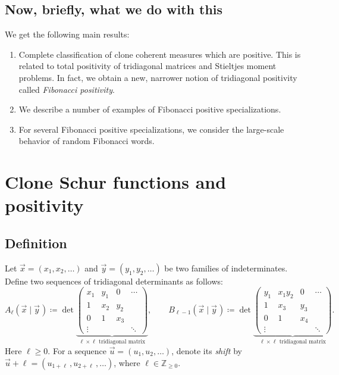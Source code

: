 \documentclass[letterpaper,11pt,oneside,reqno]{article}
\numberwithin{equation}{section}
\newcommand{\ssp}{\hspace{1pt}}
\theoremstyle{definition}
\begin{document}
\subsection{Now, briefly, what we do with this}

We get the following main results:
\begin{enumerate}
	\item Complete classification of
		clone coherent measures which are positive.
		This is related to total positivity of tridiagonal matrices and Stieltjes moment
		problems.
		In fact, we obtain a new, narrower notion of tridiagonal
		positivity called \emph{Fibonacci positivity}.
	\item We describe a number of examples of Fibonacci positive specializations.
	\item For several Fibonacci positive specializations, we consider the large-scale behavior of random Fibonacci words.
\end{enumerate}

\section{Clone Schur functions and positivity}

\subsection{Definition}

Let $\vec x=(x_1,x_2,\ldots )$ and $\vec y=(y_1,y_2,\ldots)$ be two families of indeterminates.
Define two sequences of tridiagonal determinants as follows:
\begin{equation}
	\label{eq:A_B_dets}
	A_\ell (\vec{x} \mid \vec{y}\ssp) \coloneqq
	\det
	\underbrace{\begin{pmatrix}
	x_1 & y_1 & 0 & \cdots\\
	1 & x_2 & y_2 &\\
	0 & 1 & x_3  & \\
	\vdots & & & \ddots
	\end{pmatrix}}_{\text{$\ell \times \ell $ tridiagonal matrix}} ,
	\qquad
	B_{\ell -1} (\vec{x} \mid \vec{y}\ssp) \coloneqq
	\det
	\underbrace{\begin{pmatrix}
	y_1 & x_1y_2 & 0 & \cdots\\
	1 & x_3 & y_3 &\\
	0 & 1 & x_4 & \\
	\vdots & & & \ddots
	\end{pmatrix}}_{\text{$\ell \times \ell$ tridiagonal matrix}} .
\end{equation}
Here $\ell\ge0$.
For a sequence $\vec u=(u_1,u_2,\ldots)$,
denote its
\emph{shift} by $\vec u+ \ell = (u_{1+\ell} \, ,u_{2+\ell} \, ,\ldots)$, where $\ell\in \mathbb{Z}_{\ge0}$.
\end{document}
